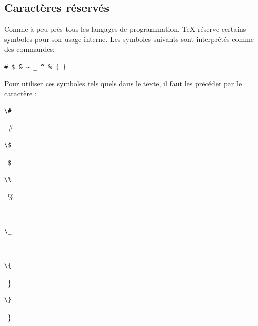 \subsection{Caractères réservés}
\label{sec:bases:caracteres:reserves}

Comme à peu près tous les langages de programmation, {\TeX} réserve
certains symboles pour son usage interne. Les symboles suivants sont
interprétés comme des commandes:
\begin{center}
  \verb=# $ & ~ _ ^ % { }=
\end{center}
Pour utiliser ces symboles tels quels dans le texte, il faut les
précéder par le caractère {\bs}:
\begin{demo}
  \begin{minipage}{0.2\linewidth}
    \begin{texample}
\begin{lstlisting}
\#
\end{lstlisting}
      \producing\ \#
    \end{texample}
  \end{minipage}
  \hfill
  \begin{minipage}{0.2\linewidth}
    \begin{texample}
\begin{lstlisting}
\$
\end{lstlisting}
      \producing\ \$
    \end{texample}
  \end{minipage}
  \hfill
  \begin{minipage}{0.2\linewidth}
    \begin{texample}
\begin{lstlisting}[commentstyle=\mdseries]
\%
\end{lstlisting}
      \producing\ \%
    \end{texample}
  \end{minipage}
  \\
  \begin{minipage}{0.2\linewidth}
    \begin{texample}
\begin{lstlisting}
\_
\end{lstlisting}
      \producing\rule{0pt}{1em}\ \_
    \end{texample}
  \end{minipage}
  \hfill
  \begin{minipage}{0.2\linewidth}
    \begin{texample}
\begin{lstlisting}
\{
\end{lstlisting}
      \producing\ \}
    \end{texample}
  \end{minipage}
  \hfill
  \begin{minipage}{0.2\linewidth}
    \begin{texample}
\begin{lstlisting}
\}
\end{lstlisting}
      \producing\ \}
    \end{texample}
  \end{minipage}
\end{demo}


